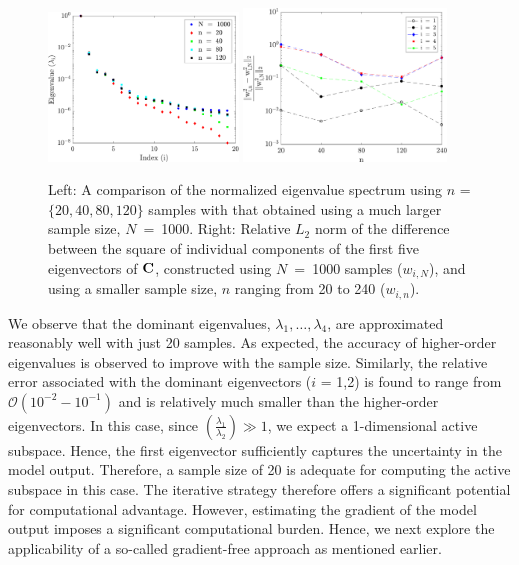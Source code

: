 %
\begin{figure}[htbp]
 \begin{center}
  \includegraphics[width=0.45\textwidth]{./Figures/eig_comp}
   \includegraphics[width=0.48\textwidth]{./Figures/err_eigv_1_5}
\caption{Left: A comparison of the normalized eigenvalue spectrum using $n$ = $\{20,40,80,120\}$ samples with that
obtained using a much larger sample size, $N$~=~1000. Right: Relative $L_2$ 
norm of the difference between
the square of individual components of the first five eigenvectors of $\mathbf{{C}}$, constructed using 
$N$~=~1000 samples ($w_{i,N}$), and using a smaller sample size, $n$ ranging from 20 to 240 ($w_{i,n}$).} 
\label{fig:eig_comp}
\end{center}
\end{figure}
%
We observe that the dominant eigenvalues, $\lambda_1, \ldots, \lambda_4$, 
are approximated 
reasonably well with just 20 samples. As expected, the accuracy of higher-order eigenvalues is observed
to improve with the sample size. Similarly, the relative error associated with the dominant eigenvectors
($i$ = 1,2) is found to range from $\mathcal{O}(10^{-2} - 10^{-1})$ and is relatively much smaller than 
the higher-order eigenvectors. In this case, since 
$\left(\frac{\lambda_1}{\lambda_2}\right)\gg 1$, we expect 
a 1-dimensional active subspace. Hence, the first eigenvector 
sufficiently captures the uncertainty in
the  model output. Therefore, a sample size of 20 is adequate for computing the active subspace in this
case. The iterative strategy therefore offers a significant potential for computational advantage. 
However, estimating the gradient of the model output imposes a significant computational burden.
Hence, we next explore the applicability of a so-called gradient-free approach
as mentioned earlier.

